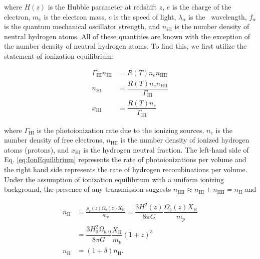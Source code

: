 where $H(z)$ is the Hubble parameter at redshift $z$, $e$ is the charge of the electron, $m_e$ is the electron mass, $c$ is the speed of light, $\lambda_{\alpha}$ is the \lya\ wavelength, $f_{\alpha}$ is the quantum mechanical oscillator strength, and $n_{\text{HI}}$ is the number density of neutral hydrogen atoms. All of these quantities are known with the exception of the number density of neutral hydrogen atoms. To find this, we first utilize the statement of ionization equilibrium:

\begin{align}
\Gamma_{\text{HI}} n_{\text{HI}} &= R(T)n_{e}n_{\text{HII}} \label{eq:IonEquilibrium} \\
n_{\text{HI}} &= \dfrac{R(T) n_{e} n_{\text{HII}}}{\Gamma_{\text{HI}}} \label{eq:nH}\\
x_{\text{HI}} &= \dfrac{R(T)n_e}{\Gamma_{\text{HI}}} \label{eq:xHI}
\end{align}

where $\Gamma_{\text{HI}}$ is the photoionization rate due to the ionizing sources, $n_{e}$ is the number density of free electrons, $n_{\text{HII}}$ is the number density of ionized hydrogen atoms (protons), and $x_{\text{HI}}$ is the hydrogen neutral fraction. The left-hand side of Eq. \ref{eq:IonEquilibrium} represents the rate of photoionizations per volume and the right hand side represents the rate of hydrogen recombinations per volume. Under the assumption of ionization equilibrium with a uniform ionizing background, the presence of any transmission suggests $n_{\text{HII}} \approx n_{\text{HI}} + n_{\text{HII}} = n_{\text{H}}$ and 

\begin{align}
\bar{n}_{\text{H}} &= \frac{\rho_{c}(z)\Omega_{b}(z)X_{\text{H}}}{m_p} = \dfrac{3H^{2}(z)}{8\pi G} \dfrac{\Omega_{b}(z) X_{\text{H}}}{m_{p}} \\
&= \dfrac{3H_{0}^{2}\Omega_{b,0}}{8\pi G} \dfrac{X_{\text{H}}}{m_p}(1+z)^{3}\\
n_{\text{H}} &= (1+\delta) \bar{n}_{\text{H}}. \label{eq:ntot}
\end{align}

